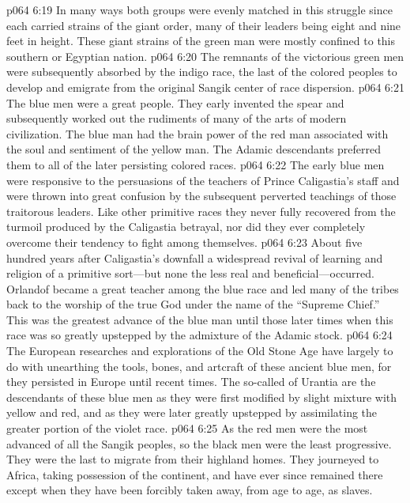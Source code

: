 \vs p064 6:19 In many ways both groups were evenly matched in this struggle since each carried strains of the giant order, many of their leaders being eight and nine feet in height. These giant strains of the green man were mostly confined to this southern or Egyptian nation.
\vs p064 6:20 The remnants of the victorious green men were subsequently absorbed by the indigo race, the last of the colored peoples to develop and emigrate from the original Sangik center of race dispersion.
\pc \vs p064 6:21 \bibnobreakspace {} The blue men were a great people. They early invented the spear and subsequently worked out the rudiments of many of the arts of modern civilization. The blue man had the brain power of the red man associated with the soul and sentiment of the yellow man. The Adamic descendants preferred them to all of the later persisting colored races.
\vs p064 6:22 The early blue men were responsive to the persuasions of the teachers of Prince Caligastia’s staff and were thrown into great confusion by the subsequent perverted teachings of those traitorous leaders. Like other primitive races they never fully recovered from the turmoil produced by the Caligastia betrayal, nor did they ever completely overcome their tendency to fight among themselves.
\vs p064 6:23 About five hundred years after Caligastia’s downfall a widespread revival of learning and religion of a primitive sort---but none the less real and beneficial---occurred. Orlandof became a great teacher among the blue race and led many of the tribes back to the worship of the true God under the name of the “Supreme Chief.” This was the greatest advance of the blue man until those later times when this race was so greatly upstepped by the admixture of the Adamic stock.
\vs p064 6:24 The European researches and explorations of the Old Stone Age have largely to do with unearthing the tools, bones, and artcraft of these ancient blue men, for they persisted in Europe until recent times. The so\hyp{}called  of Urantia are the descendants of these blue men as they were first modified by slight mixture with yellow and red, and as they were later greatly upstepped by assimilating the greater portion of the violet race.
\pc \vs p064 6:25 \bibnobreakspace {} As the red men were the most advanced of all the Sangik peoples, so the black men were the least progressive. They were the last to migrate from their highland homes. They journeyed to Africa, taking possession of the continent, and have ever since remained there except when they have been forcibly taken away, from age to age, as slaves.
